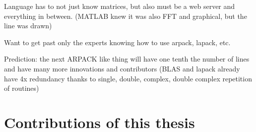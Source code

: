 Language has to not just know matrices, but also must be a web server
and everything in between. (MATLAB knew it was also FFT and graphical,
but the line was drawn)

Want to get past only the experts knowing how to use arpack, lapack,
etc.

Prediction: the next ARPACK like thing will have one tenth the number
of lines and have many more innovations and contributors (BLAS and
lapack already have 4x redundancy thanks to single, double, complex,
double complex repetition of routines)

\section{Contributions of this thesis}
